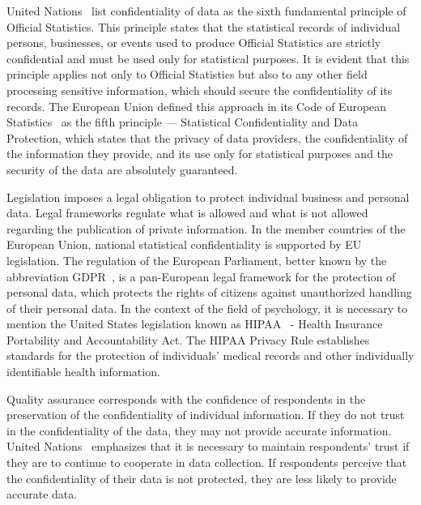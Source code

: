 \documentclass{article}
\begin{document}
United Nations~\cite{2015_UN} list confidentiality of data as the sixth fundamental principle of Official Statistics. This principle states that the statistical records of individual persons, businesses, or events used to produce Official Statistics are strictly confidential and must be used only for statistical purposes. It is evident that this principle applies not only to Official Statistics but also to any other field processing sensitive information, which should secure the confidentiality of its records. The European Union defined this approach in its Code of European Statistics~\cite{2018_Eurostat} as the fifth principle — Statistical Confidentiality and Data Protection, which states that the privacy of data providers, the confidentiality of the information they provide, and its use only for statistical purposes and the security of the data are absolutely guaranteed.

Legislation imposes a legal obligation to protect individual business and personal data. Legal frameworks regulate what is allowed and what is not allowed regarding the publication of private information. In the member countries of the European Union, national statistical confidentiality is supported by EU legislation. The regulation of the European Parliament, better known by the abbreviation GDPR~\cite{2016_EU_2016/679}, is a pan-European legal framework for the protection of personal data, which protects the rights of citizens against unauthorized handling of their personal data.
In the context of the field of psychology, it is necessary to mention the United States legislation known as HIPAA~\cite{1996_HIPAA} - Health Insurance Portability and Accountability Act.
The HIPAA Privacy Rule establishes standards for the protection of individuals' medical records and other individually identifiable health information.

Quality assurance corresponds with the confidence of respondents in the preservation of the confidentiality of individual information. If they do not trust in the confidentiality of the data, they may not provide accurate information. United Nations~\cite{2007_UN} emphasizes that it is necessary to maintain respondents' trust if they are to continue to cooperate in data collection. If respondents perceive that the confidentiality of their data is not protected, they are less likely to provide accurate data.
\end{document}
